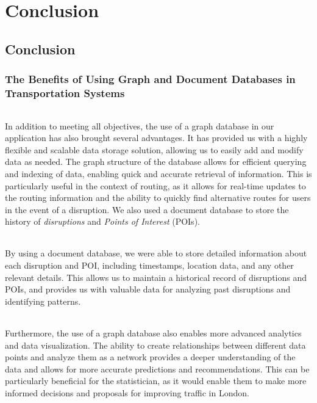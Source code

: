 \part{Conclusion}

\chapter{Conclusion}

\section{The Benefits of Using Graph and Document Databases in Transportation Systems}

\paragraph{}
In addition to meeting all objectives, the use of a graph database in our application has also brought several advantages. It has provided us with a highly flexible and scalable data storage solution, allowing us to easily add and modify data as needed. The graph structure of the database allows for efficient querying and indexing of data, enabling quick and accurate retrieval of information. This is particularly useful in the context of routing, as it allows for real-time updates to the routing information and the ability to quickly find alternative routes for users in the event of a disruption. We also used a document database to store the history of \textit{disruptions} and \textit{Points of Interest} (POIs).

\paragraph{}
By using a document database, we were able to store detailed information about each disruption and POI, including timestamps, location data, and any other relevant details. This allows us to maintain a historical record of disruptions and POIs, and provides us with valuable data for analyzing past disruptions and identifying patterns.

\paragraph{}
Furthermore, the use of a graph database also enables more advanced analytics and data visualization. The ability to create relationships between different data points and analyze them as a network provides a deeper understanding of the data and allows for more accurate predictions and recommendations. This can be particularly beneficial for the statistician, as it would enable them to make more informed decisions and proposals for improving traffic in London.

